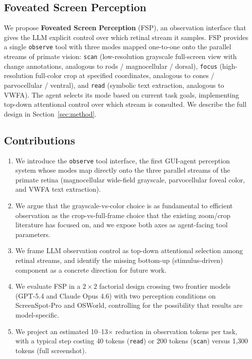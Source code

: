 \documentclass[11pt,a4paper]{article}
\begin{document}
\subsection{Foveated Screen Perception}
\label{sec:intro-fsp}

We propose \textbf{Foveated Screen Perception} (FSP), an observation interface that gives the LLM explicit control over which retinal stream it samples.
FSP provides a single \texttt{observe} tool with three modes mapped one-to-one onto the parallel streams of primate vision: \texttt{scan} (low-resolution grayscale full-screen view with change annotations, analogous to rods / magnocellular / dorsal), \texttt{focus} (high-resolution full-color crop at specified coordinates, analogous to cones / parvocellular / ventral), and \texttt{read} (symbolic text extraction, analogous to VWFA). The agent selects its mode based on current task goals, implementing top-down attentional control over which stream is consulted. We describe the full design in Section~\ref{sec:method}.

\subsection{Contributions}
\label{sec:intro-contributions}

\begin{enumerate}[leftmargin=*,itemsep=2pt]
\item We introduce the \texttt{observe} tool interface, the first GUI-agent perception system whose modes map directly onto the three parallel streams of the primate retina (magnocellular wide-field grayscale, parvocellular foveal color, and VWFA text extraction).

\item We argue that the grayscale-vs-color choice is as fundamental to efficient observation as the crop-vs-full-frame choice that the existing zoom/crop literature has focused on, and we expose both axes as agent-facing tool parameters.

\item We frame LLM observation control as top-down attentional selection among retinal streams, and identify the missing bottom-up (stimulus-driven) component as a concrete direction for future work.

\item We evaluate FSP in a $2 \times 2$ factorial design crossing two frontier models (GPT-5.4 and Claude Opus 4.6) with two perception conditions on ScreenSpot-Pro and OSWorld, controlling for the possibility that results are model-specific.

\item We project an estimated 10--13$\times$ reduction in observation tokens per task, with a typical step costing 40 tokens (\texttt{read}) or 200 tokens (\texttt{scan}) versus 1{,}300 tokens (full screenshot).
\end{enumerate}
\end{document}
